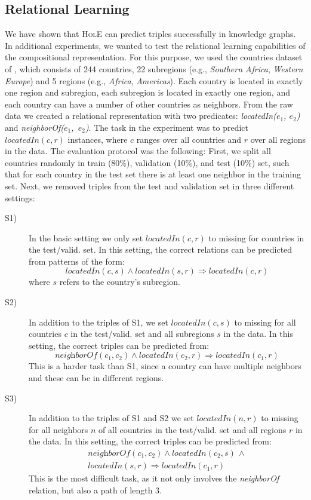\documentclass[letterpaper]{article}
\newcommand{\hole}{\textsc{HolE}\xspace}
\newcommand{\lif}{\Rightarrow} 				\DeclareMathOperator*{\argmax}{arg\,max}
\begin{document}
\subsection{Relational Learning}
We have shown that \hole can predict triples successfully in knowledge
graphs. In additional experiments, we wanted to test the relational learning
capabilities of the compositional representation. For this purpose, we used the
countries dataset of \citet{bouchard2015approximate}, which consists of 244
countries, 22 subregions (e.g., \textit{Southern Africa}, \textit{Western
  Europe}) and 5 regions (e.g., \textit{Africa}, \textit{Americas}). 
Each country is located in exactly one region and subregion, each subregion is
located in exactly one region, and each country can have a number of other
countries as neighbors. From the raw data we created a relational representation
with two predicates: \textit{locatedIn($e_1$, $e_2$)} and
\mbox{\textit{neighborOf($e_1$, $e_2$)}}.
The task in the experiment was to predict $\textit{locatedIn}(c, r)$ instances,
where $c$ ranges over all countries and $r$ over all regions in the data.
The evaluation protocol was the following: First, we split all countries randomly in
train (80\%), validation (10\%), and test (10\%) set, such that for each country
in the test set there is at least one neighbor in the training set.
Next, we removed triples from the test and validation set
in three different settings:
\begin{description}
\item[S1)] In the basic setting we only set $\textit{locatedIn}(c,r)$ to missing for
  countries in the test/valid. set. In this
  setting, the correct relations can be predicted from patterns of the form:
  \[
    \textit{locatedIn}(c, s) \land \textit{locatedIn}(s, r) \lif \textit{locatedIn}(c, r)
  \]
  where $s$ refers to the country's subregion.
\item[S2)] In addition to the triples of S1, we set
  $\textit{locatedIn}(c, s)$ to missing for all
  countries $c$ in the test/valid. set and all subregions $s$ in the data. 
  In this setting, the correct triples can be predicted from:
  \[
    \textit{neighborOf}(c_1, c_2) \land \textit{locatedIn}(c_2, r) \lif \textit{locatedIn}(c_1, r)
  \]
  This is a harder task than S1, since a country can have multiple
  neighbors and these can be in different regions.
\item[S3)] In addition to the triples of S1 and S2 we set
  $\textit{locatedIn}(n, r)$ to missing for all neighbors $n$ of all countries in the test/valid. set
  and all regions $r$ in the data. In this setting, the correct
  triples can be predicted from: 
  \begin{multline*}
    \textit{neighborOf}(c_1, c_2) \land \textit{locatedIn}(c_2, s)\, \land \\
    \textit{locatedIn}(s, r) \lif \textit{locatedIn}(c_1, r)
  \end{multline*}
  This is the most difficult task, as it not only involves the
  \textit{neighborOf} relation, but also a path of length 3.
\end{description}
\end{document}
